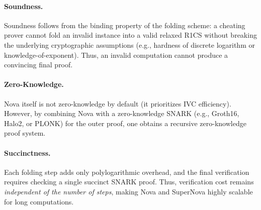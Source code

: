\paragraph{Soundness.}  
Soundness follows from the binding property of the folding scheme: a cheating prover cannot fold an invalid instance into a valid relaxed R1CS without breaking the underlying cryptographic assumptions (e.g., hardness of discrete logarithm or knowledge-of-exponent).  
Thus, an invalid computation cannot produce a convincing final proof.  

\paragraph{Zero-Knowledge.}  
Nova itself is not zero-knowledge by default (it prioritizes IVC efficiency).  
However, by combining Nova with a zero-knowledge SNARK (e.g., Groth16, Halo2, or PLONK) for the outer proof, one obtains a recursive zero-knowledge proof system.  

\paragraph{Succinctness.}  
Each folding step adds only polylogarithmic overhead, and the final verification requires checking a single succinct SNARK proof.  
Thus, verification cost remains \emph{independent of the number of steps}, making Nova and SuperNova highly scalable for long computations.
